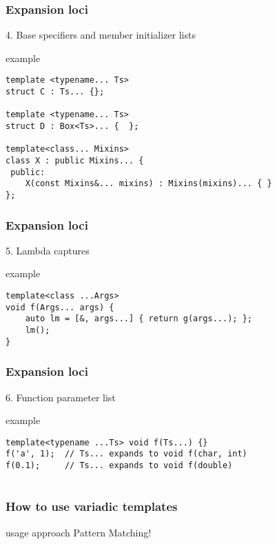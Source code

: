 \documentclass{beamer}
\begin{document}
\begin{frame}[fragile]
\frametitle{Expansion loci }

4. Base specifiers and member initializer lists

\begin{block}{example}
\begin{lstlisting}
template <typename... Ts>
struct C : Ts... {};

template <typename... Ts>
struct D : Box<Ts>... {  };

template<class... Mixins>
class X : public Mixins... {
 public:
    X(const Mixins&... mixins) : Mixins(mixins)... { }
};
\end{lstlisting}
\end{block}

\end{frame}


\begin{frame}[fragile]
\frametitle{Expansion loci }

5. Lambda captures

\begin{block}{example}
\begin{lstlisting}
template<class ...Args>
void f(Args... args) {
    auto lm = [&, args...] { return g(args...); };
    lm();
}
\end{lstlisting}
\end{block}

\end{frame}


\begin{frame}[fragile]
\frametitle{Expansion loci }

6. Function parameter list

\begin{block}{example}
\begin{lstlisting}
template<typename ...Ts> void f(Ts...) {}
f('a', 1);  // Ts... expands to void f(char, int)
f(0.1);     // Ts... expands to void f(double)
 
\end{lstlisting}
\end{block}

\end{frame}

\begin{frame}[fragile]
\frametitle{How to use variadic templates}

\begin{block}{usage approach}
Pattern Matching!
\end{block}

\end{frame}
\end{document}
